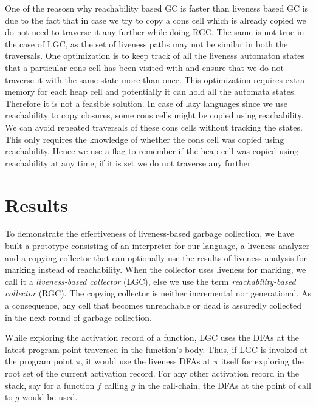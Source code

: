 \documentclass[9pt]{sigplanconf}
\begin{document}
\begin{enumerate}
\begin{enumerate}
\end{enumerate}
One of the  reasosn why reachability based GC  is faster than liveness
based GC is  due to the fact that  in case we try to copy  a cons cell
which is  already copied  we do  not need to  traverse it  any further
while doing RGC. The  same is not true in the case  of LGC, as the set
of  liveness paths  may not  be similar  in both  the  traversals. One
optimization is  to keep  track of all  the liveness  automaton states
that a particular  cons cell has been visited with  and ensure that we
do  not  traverse  it  with  the  same state  more  than  once.   This
optimization requires extra memory  for each heap cell and potentially
it can hold  all the automata states.  Therefore it  is not a feasible
solution. In case of lazy  languages since we use reachability to copy
closures, some cons  cells might be copied using  reachability. We can
avoid  repeated traversals of  these cons  cells without  tracking the
states. This only requires the  knowledge of whether the cons cell was
copied using  reachability.  Hence  we use a  flag to remember  if the
heap cell was  copied using reachability at any time, if  it is set we
do not traverse any further.

\section{Results}
To demonstrate the effectiveness of liveness-based garbage collection,
we  have  built a  prototype  consisting  of  an interpreter  for  our
language,  a  liveness  analyzer  and  a copying  collector  that  can
optionally use the results of liveness analysis for marking instead of
reachability. When the collector uses liveness for marking, we call it
a  {\em liveness-based  collector} (LGC),  else we  use the  term {\em
  reachability-based  collector}  (RGC).   The  copying  collector  is
neither incremental nor generational.  As a consequence, any cell that
becomes unreachable or  dead is assuredly collected in  the next round
of garbage collection.

While exploring the activation record of a function, LGC uses the DFAs
at  the latest  program  point traversed  in the function's body.  Thus, if  LGC
is invoked  at the program point   $\pi$,  it would  use  the
liveness  DFAs at  $\pi$ itself for exploring the root set of the
current activation record. For any other activation record in the
stack, say for a function ${\mathit f}$ calling ${\mathit g}$ in the call-chain,
the DFAs at the point of call to  ${\mathit g}$ would be used.




\end{enumerate}
\end{document}
